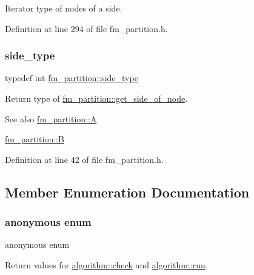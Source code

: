 Iterator type of nodes of a side. 

Definition at line 294 of file fm\+\_\+partition.\+h.

\mbox{\label{classfm__partition_a7cdff1bea3740a287387e8408e16ca79}} 
\subsubsection{\texorpdfstring{side\+\_\+type}{side\_type}}
{\footnotesize\ttfamily typedef int \mbox{\hyperlink{classfm__partition_a7cdff1bea3740a287387e8408e16ca79}{fm\+\_\+partition\+::side\+\_\+type}}}

Return type of \mbox{\hyperlink{classfm__partition_af5f6ad817fe30760f3bc5470bd70c4c9}{fm\+\_\+partition\+::get\+\_\+side\+\_\+of\+\_\+node}}.

\begin{DoxySeeAlso}{See also}
\mbox{\hyperlink{classfm__partition_a738e75c601403754e61e6dac623fd3ab}{fm\+\_\+partition\+::A}} 

\mbox{\hyperlink{classfm__partition_a42515c44eecb7ba3e2ec549a877ef238}{fm\+\_\+partition\+::B}} 
\end{DoxySeeAlso}


Definition at line 42 of file fm\+\_\+partition.\+h.



\subsection{Member Enumeration Documentation}
\mbox{\label{classalgorithm_af1a0078e153aa99c24f9bdf0d97f6710}} 
\subsubsection{\texorpdfstring{anonymous enum}{anonymous enum}}
{\footnotesize\ttfamily anonymous enum\hspace{0.3cm}{\ttfamily [inherited]}}



Return values for \mbox{\hyperlink{classalgorithm_a76361fb03ad1cf643affc51821e43bed}{algorithm\+::check}} and \mbox{\hyperlink{classalgorithm_a734b189509a8d6b56b65f8ff772d43ca}{algorithm\+::run}}. 

